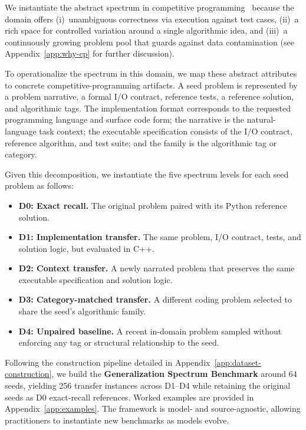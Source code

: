 \documentclass[]{bytedance_seed}
\theoremstyle{plain}
\theoremstyle{definition}
\theoremstyle{remark}
\begin{document}
We instantiate the abstract spectrum in competitive programming~\citep{hendrycks2021apps,li2022competition} because the domain offers (i)~unambiguous correctness via execution against test cases, (ii)~a rich space for controlled variation around a single algorithmic idea, and (iii)~a continuously growing problem pool that guards against data contamination (see Appendix~\ref{app:why-cp} for further discussion).

To operationalize the spectrum in this domain, we map these abstract attributes to concrete competitive-programming artifacts.
A seed problem is represented by a problem narrative, a formal I/O contract, reference tests, a reference solution, and algorithmic tags. 
The implementation format corresponds to the requested programming language and surface code form; the narrative is the natural-language task context; the executable specification consists of the I/O contract, reference algorithm, and test suite; and the family is the algorithmic tag or category.

Given this decomposition, we instantiate the five spectrum levels for each seed problem as follows:
\begin{itemize}
    \item \textbf{D0: Exact recall.} The original problem paired with its Python reference solution.
    \item \textbf{D1: Implementation transfer.} The same problem, I/O contract, tests, and solution logic, but evaluated in C++.
    \item \textbf{D2: Context transfer.} A newly narrated problem that preserves the same executable specification and solution logic.
    \item \textbf{D3: Category-matched transfer.} A different coding problem selected to share the seed's algorithmic family.
    \item \textbf{D4: Unpaired baseline.} A recent in-domain problem sampled without enforcing any tag or structural relationship to the seed.
\end{itemize}

Following the construction pipeline detailed in Appendix~\ref{app:dataset-construction}, we build the \textbf{Generalization Spectrum Benchmark} around 64 seeds, yielding 256 transfer instances across D1--D4 while retaining the original seeds as D0 exact-recall references. Worked examples are provided in Appendix~\ref{app:examples}. The framework is model- and source-agnostic, allowing practitioners to instantiate new benchmarks as models evolve.
\end{document}
